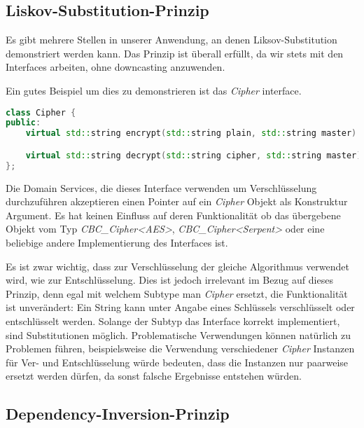 \subsection{Liskov-Substitution-Prinzip}

Es gibt mehrere Stellen in unserer Anwendung, an denen Liksov-Substitution demonstriert werden kann. Das Prinzip ist überall erfüllt, da wir stets mit den Interfaces arbeiten, ohne downcasting anzuwenden.

Ein gutes Beispiel um dies zu demonstrieren ist das \textit{Cipher} interface.

\begin{lstlisting}[language=C++]
class Cipher {
public:
    virtual std::string encrypt(std::string plain, std::string master) const = 0;

    virtual std::string decrypt(std::string cipher, std::string master) const = 0;
};
\end{lstlisting}

Die Domain Services, die dieses Interface verwenden um Verschlüsselung durchzuführen akzeptieren einen Pointer auf ein \textit{Cipher} Objekt als Konstruktur Argument. Es hat keinen Einfluss auf deren Funktionalität ob das übergebene Objekt vom Typ \textit{CBC\_Cipher<AES>}, \textit{CBC\_Cipher<Serpent>} oder eine beliebige andere Implementierung des Interfaces ist.

Es ist zwar wichtig, dass zur Verschlüsselung der gleiche Algorithmus verwendet wird, wie zur Entschlüsselung. Dies ist jedoch irrelevant im Bezug auf dieses Prinzip, denn egal mit welchem Subtype man \textit{Cipher} ersetzt, die Funktionalität ist unverändert: Ein String kann unter Angabe eines Schlüssels verschlüsselt oder entschlüsselt werden. Solange der Subtyp das Interface korrekt implementiert, sind Substitutionen möglich.
Problematische Verwendungen können natürlich zu Problemen führen, beispielsweise die Verwendung verschiedener \textit{Cipher} Instanzen für Ver- und Entschlüsselung würde bedeuten, dass die Instanzen nur paarweise ersetzt werden dürfen, da sonst falsche Ergebnisse entstehen würden.

\subsection{Dependency-Inversion-Prinzip}

